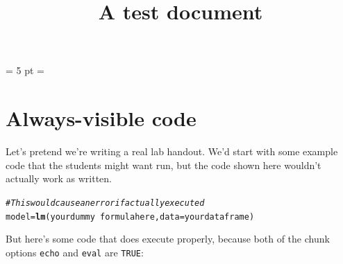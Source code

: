 \documentclass[letterpaper]{article}\usepackage[]{graphicx}\usepackage[]{color}
\title{\vspace{-2.0cm}A test document}
\author{}
\date{}
\makeatletter
\newcommand{\hlcom}[1]{\textcolor[rgb]{0.678,0.584,0.686}{\textit{#1}}}%
\newcommand{\hlkwd}[1]{\textcolor[rgb]{0.737,0.353,0.396}{\textbf{#1}}}%
\newenvironment{kframe}{%
 \def\at@end@of@kframe{}%
 \ifinner\ifhmode%
  \def\at@end@of@kframe{\end{minipage}}%
  \begin{minipage}{\columnwidth}%
 \fi\fi%
 \def\FrameCommand##1{\hskip\@totalleftmargin \hskip-\fboxsep
 \colorbox{shadecolor}{##1}\hskip-\fboxsep
     \hskip-\linewidth \hskip-\@totalleftmargin \hskip\columnwidth}%
 \MakeFramed {\advance\hsize-\width
   \@totalleftmargin\z@ \linewidth\hsize
   \@setminipage}}%
 {\par\unskip\endMakeFramed%
 \at@end@of@kframe}
\newenvironment{knitrout}{}{} %
\makeatother
\begin{document}
\pagestyle{fancy}
\headsep = 5 pt
\headwidth = \textwidth
\lhead{}
\chead{}
\rhead{}
\lfoot{}

\renewcommand{\headrulewidth}{0.0pt}
\renewcommand{\footrulewidth}{0.4pt}
\maketitle
\vspace{-1.0cm}




\section{Always-visible code}
Let's pretend we're writing a real lab handout. We'd start with some example
code that the students might want run, but the code shown here wouldn't 
actually work as written.

\begin{knitrout}
\color{fgcolor}\begin{kframe}
\begin{alltt}
\hlcom{# This would cause an error if actually executed}
model = \hlkwd{lm}( your dummy ~ formula here, data = your data frame) 
\end{alltt}
\end{kframe}
\end{knitrout}

But here's some code that does execute properly, because both of the chunk 
options \texttt{echo} and \texttt{eval} are \texttt{TRUE}:
\end{document}
